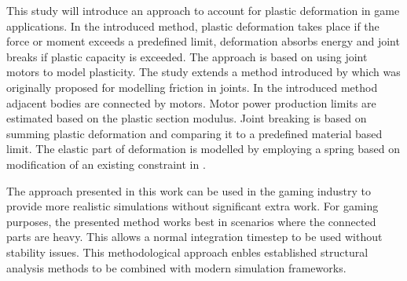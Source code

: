 This study will introduce an approach to account for plastic deformation in game applications.   
In the introduced method, plastic deformation takes place if the force or moment exceeds a predefined 
limit, deformation absorbs energy and joint breaks if plastic capacity is exceeded. 
The approach is based on using joint motors to model plasticity. 
The study extends a method introduced by
\cite{erleben.thesis} 
which was originally proposed for modelling friction in joints. 
In the introduced method adjacent bodies are connected by motors. 
Motor power production limits are estimated based on the plastic section modulus. 
Joint breaking is based on summing plastic deformation and comparing it to a
predefined material based limit. The elastic part of deformation is modelled by employing 
a spring based on modification of an existing constraint in \cbullet.

The approach presented in this work can be used in the gaming industry to provide more realistic 
simulations without significant extra work. For gaming purposes, the presented method works 
best in scenarios where the connected parts are heavy. This allows a normal 
integration timestep to be used without stability issues. 
This methodological approach enbles established structural analysis
methods to be combined with modern simulation frameworks.

